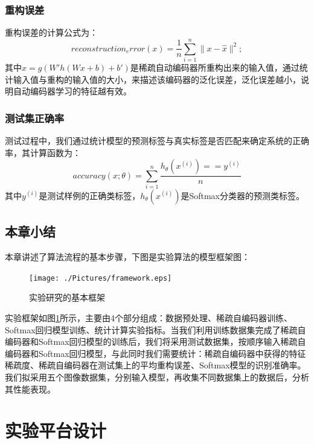 \documentclass[oneside]{ZJUthesis}
\begin{document}
\subsection{重构误差}
重构误差的计算公式为：
\begin{equation}
	reconstruction_error(x)=\frac{1}{n}\sum\limits_{i=1}^{n}{\|x-\hat x\|^2};
\end{equation}
其中$\hat x=g(W'h(Wx+b)+b')$是稀疏自动编码器所重构出来的输入值，通过统计输入值与重构的输入值的大小，来描述该编码器的泛化误差，泛化误差越小，说明自动编码器学习的特征越有效。

\subsection{测试集正确率}
测试过程中，我们通过统计模型的预测标签与真实标签是否匹配来确定系统的正确率，其计算函数为：
\begin{equation}
	accuracy(x;\theta)=\sum\limits_{i=1}^{n}{\frac{h_{\theta}(x^{(i)})==y^{(i)}}{n}}
\end{equation}
其中$y^{(i)}$是测试样例的正确类标签，$h_{\theta}(x^{(i)})$是Softmax分类器的预测类标签。

\section{本章小结}
本章讲述了算法流程的基本步骤，下图是实验算法的模型框架图：
\begin{figure}[H]
\centering
\texttt{[image: ./Pictures/framework.eps]}
\caption{实验研究的基本框架\label{fig:framework}}
\end{figure}

实验框架如图\ref{fig:framework}所示，主要由4个部分组成：数据预处理、稀疏自编码器训练、Softmax回归模型训练、统计计算实验指标。当我们利用训练数据集完成了稀疏自编码器和Softmax回归模型的训练后，我们将采用测试数据集，按顺序输入稀疏自编码器和Softmax回归模型，与此同时我们需要统计：稀疏自编码器中获得的特征稀疏度、稀疏自编码器在测试集上的平均重构误差、Softmax模型的识别准确率。我们拟采用五个图像数据集，分别输入模型，再收集不同数据集上的数据后，分析其性能表现。


\chapter{实验平台设计}
\end{document}
